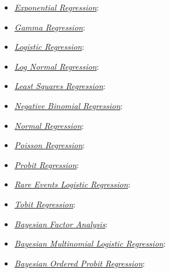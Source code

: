 \documentclass[letterpaper,10pt,english]{sphinxmanual}
\begin{document}
\begin{itemize}
\item {} 
{\hyperref[zelig-exp:zexp]{\emph{Exponential Regression}}}: 

\item {} 
{\hyperref[zelig-gamma:zgamma]{\emph{Gamma Regression}}}: 

\item {} 
{\hyperref[zelig-logit:zlogit]{\emph{Logistic Regression}}}: 

\item {} 
{\hyperref[zelig-lognorm:zlognorm]{\emph{Log Normal Regression}}}: 

\item {} 
{\hyperref[zelig-ls:zls]{\emph{Least Squares Regression}}}: 

\item {} 
{\hyperref[zelig-negbin:znegbin]{\emph{Negative Binomial Regression}}}: 

\item {} 
{\hyperref[zelig-normal:znorm]{\emph{Normal Regression}}}: 

\item {} 
{\hyperref[zelig-poisson:zpoisson]{\emph{Poisson Regression}}}: 

\item {} 
{\hyperref[zelig-probit:zprobit]{\emph{Probit Regression}}}: 

\item {} 
{\hyperref[zelig-relogit:zrelogit]{\emph{Rare Events Logistic Regression}}}: 

\item {} 
{\hyperref[zelig-tobit:ztobit]{\emph{Tobit Regression}}}: 

\item {} 
{\hyperref[zelig-factorbayes:zfactorbayes]{\emph{Bayesian Factor Analysis}}}: 

\item {} 
{\hyperref[zelig-mlogitbayes:zmlogitbayes]{\emph{Bayesian Multinomial Logistic Regression}}}: 

\item {} 
{\hyperref[zelig-oprobitbayes:zoprobitbayes]{\emph{Bayesian Ordered Probit Regression}}}: 


\end{itemize}
\end{document}
